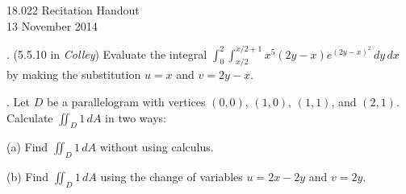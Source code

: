 \documentclass[11pt]{article}
\theoremstyle{definition}
\newcounter{prob}
\newcounter{subprob}
\newcommand\itm{\theprob.  \stepcounter{prob}\setcounter{subprob}{1}}
\newcommand\sol[2]{\iftoggle{solutions}{\begin{proof}[Solution] #1\end{proof}}{#2}}
\newcommand\twomatrixdet[4]{
\left|
\begin{array}{cc}
#1 & #2 \\
#3 & #4
\end{array}
\right|
}
\begin{document}
\thispagestyle{empty}

\begin{center}
  18.022 Recitation Handout \iftoggle{solutions}{(with solutions)}{} \\
  13 November 2014 \\

\end{center}




\itm (5.5.10 in \textit{Colley}) Evaluate the integral $\displaystyle{\int_{0}^{2}\!\int_{x/2}^{x/2+1} x^5 (2y - x)e^{(2y-x)^2} \,dy\,dx}$ by making the substitution $u = x$ and $v=2y-x$. 

\sol{
Substitution shows that the limits of integration become $u \in [0,2]$ and $v\in [0,2]$. We calculate 
\[
\left|\frac{\partial(x,y)}{\partial(u,v)}\right| = \left|
\begin{array}{cc}
1 & 1/2 \\
0 & 1/2
\end{array}
\right|=1/2,
\]
so the formula for change of variables gives 
  \begin{align*}
    \int_{0}^{2}\!\int_{0}^{2} u^5 v e^{v^2} \left|\frac{\partial(x,y)}{\partial(u,v)}\right| \,dv\,du &=
    \int_{0}^{2} \frac{1}{2}\left[\frac12 u^5 e^{v^2}\right]_{0}^{2} \, du \\
    &= \int_{0}^{2} \frac14 u^5 (e^4-1) \, du 
    = \boxed{\frac{8}{3}(e^4-1)}. \qedhere
  \end{align*}
}{\vfill}
\itm Let $D$ be a parallelogram with vertices $(0,0)$, $(1,0)$, $(1,1)$, and $(2,1)$. Calculate $\iint_D 1\,dA$ in two ways:

(a) Find $\iint_D 1\,dA$ without using calculus. 

(b) Find $\iint_D 1\,dA$ using the change of variables $u = 2x - 2y$ and $v=2y$. 

\sol{
(a) The integral in question is the area of the parallelogram, which is $(\text{base})(\text{height})=1\times 1 = \boxed{1}$. (b) To calculate this area using the suggested change of variables, we note that the linear transformation sends the four vertices of $D$ to the vertices of a square $[0,2]\times[0,2]$. Since the transformation is linear, it sends $D$ to $[0,2]\times[0,2]$. We calculate 
\begin{align*}
  \iint_D 1\,dA &= \int_0^2\!\int_0^2 1 \twomatrixdet{\partial x/\partial u}{\partial y/\partial u}{\partial x/\partial v}{\partial y/ \partial v} du \,dv\\
&= \int_0^2\!\int_0^2 1 \twomatrixdet{\frac12}{0}{\frac12}{1/2} du \,dv\\
&= 4(1/2)^2 = \boxed{1}. \qedhere
\end{align*}
}{\vfill} 
\end{document}
